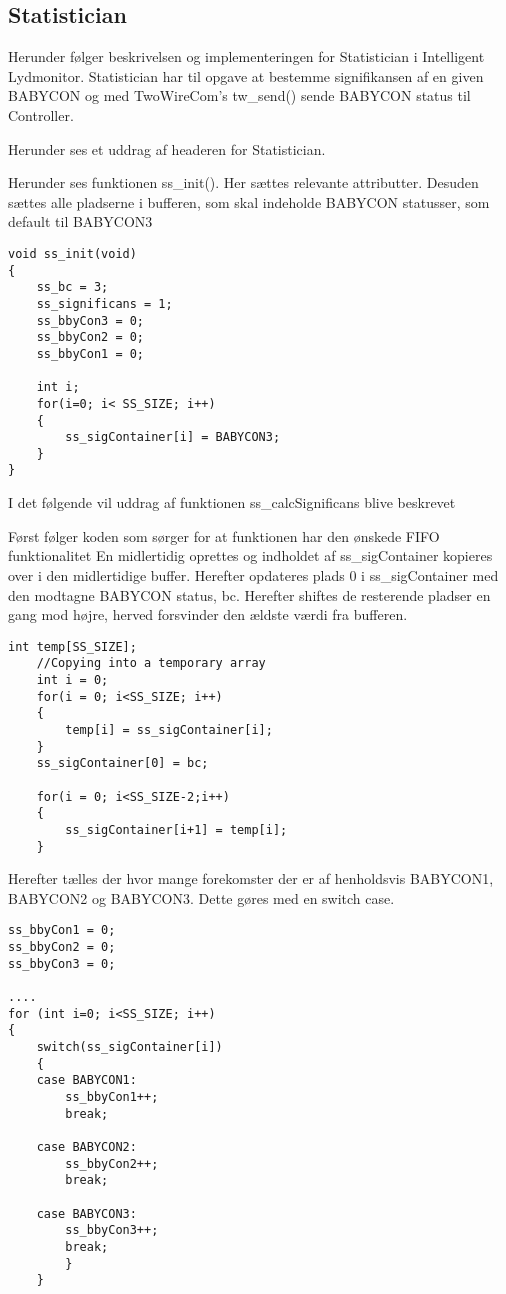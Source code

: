 \subsection{Statistician}
Herunder følger beskrivelsen og implementeringen for Statistician i Intelligent Lydmonitor.
Statistician har til opgave at bestemme signifikansen af en given BABYCON og med TwoWireCom's tw\_send() sende BABYCON status til Controller. 

Herunder ses et uddrag af headeren for Statistician. 


Herunder ses funktionen ss\_init(). Her sættes relevante attributter. Desuden sættes alle pladserne i bufferen, som skal indeholde BABYCON statusser, som default til BABYCON3

\begin{verbatim}
void ss_init(void)
{
	ss_bc = 3;
	ss_significans = 1;
	ss_bbyCon3 = 0;
	ss_bbyCon2 = 0;
	ss_bbyCon1 = 0;

	int i;
	for(i=0; i< SS_SIZE; i++)
	{
		ss_sigContainer[i] = BABYCON3;
	}
}
\end{verbatim}

I det følgende vil uddrag af funktionen ss\_calcSignificans blive beskrevet 

Først følger koden som sørger for at funktionen har den ønskede FIFO funktionalitet
En midlertidig oprettes og indholdet af ss\_sigContainer kopieres over i den midlertidige buffer. 
Herefter opdateres plads 0 i ss\_sigContainer med den modtagne BABYCON status, bc. Herefter shiftes de resterende pladser en gang mod højre, herved forsvinder den ældste værdi fra bufferen. 

\begin{verbatim}
int temp[SS_SIZE];
	//Copying into a temporary array
	int i = 0;
	for(i = 0; i<SS_SIZE; i++)
	{
		temp[i] = ss_sigContainer[i];
	}
	ss_sigContainer[0] = bc;

	for(i = 0; i<SS_SIZE-2;i++)
	{
		ss_sigContainer[i+1] = temp[i];
	}
\end{verbatim}

Herefter tælles der hvor mange forekomster der er af henholdsvis BABYCON1, BABYCON2 og BABYCON3. Dette gøres med en switch case. 

\begin{verbatim}
ss_bbyCon1 = 0;
ss_bbyCon2 = 0;
ss_bbyCon3 = 0;

....
for (int i=0; i<SS_SIZE; i++)
{
	switch(ss_sigContainer[i])
	{
	case BABYCON1:
		ss_bbyCon1++;
		break;
	
	case BABYCON2:
		ss_bbyCon2++;
		break;
	
	case BABYCON3:
		ss_bbyCon3++;
		break;
		}
	}
\end{verbatim}

